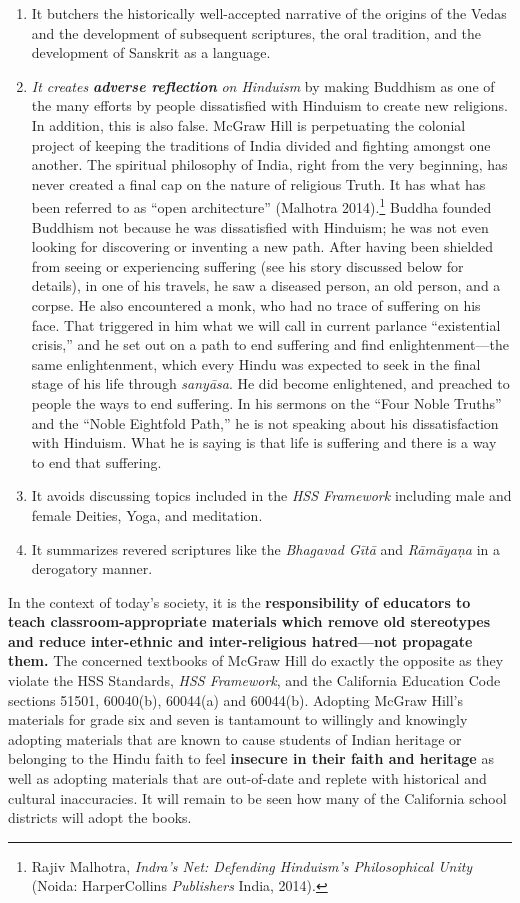 \begin{enumerate}
\item It butchers the historically well-accepted narrative of the origins of the Vedas and the development of subsequent scriptures, the oral tradition, and the  development of Sanskrit as a language. 

\item \textit{It creates} \textit{\textbf{adverse reflection}} \textit{ on Hinduism} by making Buddhism as one of the many efforts by people dissatisfied with Hinduism to create new religions. In addition, this is also false. McGraw Hill is perpetuating the colonial project of keeping the traditions of India divided and fighting amongst one another. The spiritual philosophy of India, right from the very beginning, has never created a final cap on the nature of religious Truth. It has what has been referred to as “open architecture” (Malhotra 2014).\footnote{Rajiv Malhotra, \textit{Indra’s Net: Defending Hinduism’s Philosophical Unity} (Noida: HarperCollins \textit{Publishers} India, 2014).} Buddha founded Buddhism not because he was dissatisfied with Hinduism; he was not even looking for discovering or inventing a new path. After having been shielded from seeing or experiencing suffering (see his story discussed below for details), in one of his travels, he saw a diseased person, an old person, and a corpse. He also encountered a monk, who had no trace of suffering on his face. That triggered in him what we will call in current parlance “existential crisis,” and he set out on a path to end suffering and find enlightenment—the same enlightenment, which every Hindu was expected to seek in the final stage of his life through \textit{sanyāsa}. He did become enlightened, and preached to people the ways to end suffering. In his sermons on the “Four Noble Truths” and the “Noble Eightfold Path,” he is not speaking about his dissatisfaction with Hinduism. What he is saying is that life is suffering and there is a way to end that suffering. 

\item It avoids discussing topics included in the \textit{HSS Framework} including male and female Deities, Yoga, and meditation.
\item It summarizes revered scriptures like the \textit{Bhagavad Gītā} and \textit{Rāmāyaṇa} in a derogatory manner.
\end{enumerate}
In the context of today’s society, it is the \textbf{responsibility of educators to teach classroom-appropriate materials which remove old stereotypes and reduce inter-ethnic and inter-religious hatred—not propagate them.} The concerned textbooks of McGraw Hill do exactly the opposite as they violate the HSS Standards, \textit{HSS Framework}, and the California Education Code sections 51501, 60040(b), 60044(a) and 60044(b). Adopting McGraw Hill’s materials for grade six and seven is tantamount to willingly and knowingly adopting materials that are known to cause students of Indian heritage or belonging to the Hindu faith to feel \textbf{insecure in their faith and heritage} as well as adopting materials that are out-of-date and replete with historical and cultural inaccuracies. It will remain to be seen how many of the California school districts will adopt the books. 

